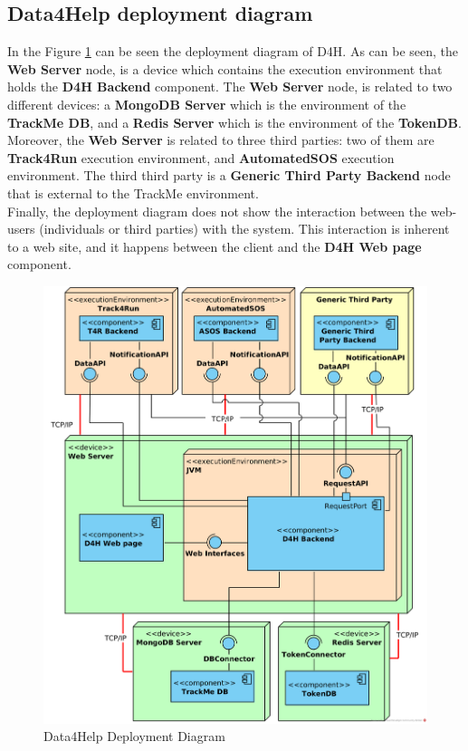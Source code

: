 \documentclass[a4paper, hidelinks, 12pt]{report}
\begin{document}
	\subsection{Data4Help deployment diagram}
	In the Figure \ref{fig:d4h_deployment_diagram} can be seen the deployment diagram of D4H. As can be seen, the \textbf{Web Server} node, is a device which contains the execution environment that holds the \textbf{D4H Backend} component. The \textbf{Web Server} node, is related to two different devices: a \textbf{MongoDB Server} which is the environment of the \textbf{TrackMe DB}, and a \textbf{Redis Server} which is the environment of the \textbf{TokenDB}.\\
	
	Moreover, the \textbf{Web Server} is related to three third parties: two of them are \textbf{Track4Run} execution environment, and \textbf{AutomatedSOS} execution environment. The third third party is a \textbf{Generic Third Party Backend} node that is external to the TrackMe environment.\\
	
	Finally, the deployment diagram does not show the interaction between the web-users (individuals or third parties) with the system. This interaction is inherent to a web site, and it happens between the client and the \textbf{D4H Web page} component.
	
		\begin{figure}[H]
			\centering
			\includegraphics[width=1\textwidth]{diagrams/d4h_deployment_diagram.png}
			\caption[Data4Help Deployment Diagram]{Data4Help Deployment Diagram}
			\label{fig:d4h_deployment_diagram}
		\end{figure}	
	
\end{document}
